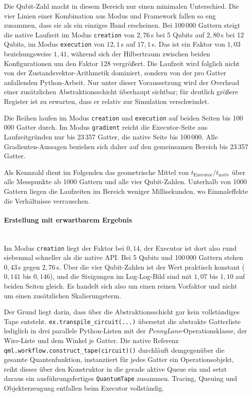 Die Qubit-Zahl macht in diesem Bereich nur einen minimalen Unterschied. Die vier
Linien einer Kombination aus Modus und Framework fallen so eng zusammen, dass
sie als ein einziges Band erscheinen. Bei 100\,000 Gattern steigt die native
Laufzeit im Modus \texttt{creation} von $2{,}76$\,s bei 5 Qubits auf
$2{,}80$\,s bei 12 Qubits, im Modus \texttt{execution} von $12{,}1$\,s auf
$17{,}1$\,s. Das ist ein Faktor von $1{,}03$ beziehungsweise $1{,}41$, während
sich der Hilbertraum zwischen beiden Konfigurationen um den Faktor 128
vergrößert. Die Laufzeit wird folglich nicht von der Zustandsvektor-Arithmetik
dominiert, sondern von der pro Gatter anfallenden Python-Arbeit. Nur unter
dieser Voraussetzung wird der Overhead einer zusätzlichen Abstraktionsschicht
überhaupt sichtbar; für deutlich größere Register ist zu erwarten, dass er
relativ zur Simulation verschwindet.

Die Reihen laufen im Modus \texttt{creation} und \texttt{execution} auf beiden
Seiten bis 100\,000 Gatter durch. Im Modus \texttt{gradient} reicht die
Executor-Seite aus Laufzeitgründen nur bis 23\,357 Gatter, die native Seite bis
100\,000. Alle Gradienten-Aussagen beziehen sich daher auf den gemeinsamen
Bereich bis 23\,357 Gatter.

Als Kennzahl dient im Folgenden das geometrische Mittel von
$t_{\mathrm{Executor}}/t_{\mathrm{nativ}}$ über alle Messpunkte ab 1000 Gattern
und alle vier Qubit-Zahlen. Unterhalb von 1000 Gattern liegen die Laufzeiten im
Bereich weniger Millisekunden, wo Einmaleffekte die Verhältnisse verrauschen.

\paragraph*{Erstellung mit erwartbarem Ergebnis}\mbox{}\\
Im Modus \texttt{creation} liegt der Faktor bei $0{,}14$, der Executor ist dort
also rund siebenmal schneller als die native API. Bei 5 Qubits und 100\,000
Gattern stehen $0{,}43$\,s gegen $2{,}76$\,s. Über die vier Qubit-Zahlen ist der
Wert praktisch konstant ($0{,}141$ bis $0{,}146$), und die Steigungen im
Log-Log-Bild sind mit $1{,}07$ bis $1{,}10$ auf beiden Seiten gleich. Es handelt
sich also um einen reinen Vorfaktor und nicht um einen zusätzlichen
Skalierungsterm.

Der Grund liegt darin, dass über die Abstraktionsschicht gar kein vollständiges
Tape entsteht. \verb|ex.transpile_circuit(...)| übersetzt die abstrakte
Gatterliste lediglich in drei parallele Python-Listen mit der
\textit{PennyLane}-Operationsklasse, der Wire-Liste und dem Winkel je Gatter.
Die native Referenz \texttt{qml.\allowbreak workflow.\allowbreak construct\_\allowbreak tape\allowbreak(circuit)()} durchläuft demgegenüber die gesamte Quantenfunktion, instanziiert für jedes Gatter ein
Operationsobjekt, reiht dieses über den Konstruktor in die gerade aktive Queue
ein und setzt daraus ein ausführungsfertiges \texttt{QuantumTape} zusammen.
Tracing, Queuing und Objekterzeugung entfallen beim Executor vollständig.

